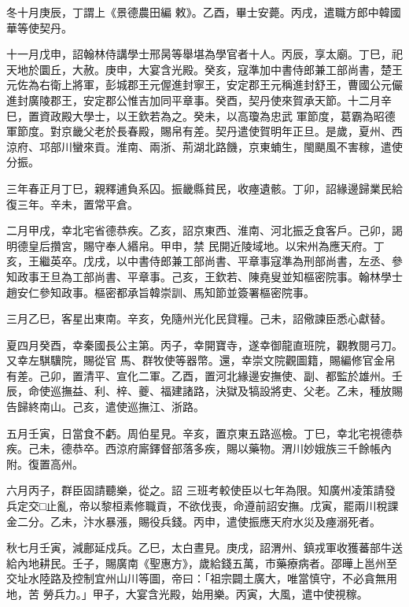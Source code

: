 \begin{pinyinscope}
 冬十月庚辰，丁謂上《景德農田編
 敕》。乙酉，畢士安薨。丙戌，遣職方郎中韓國華等使契丹。



 十一月戊申，詔翰林侍講學士邢昺等舉堪為學官者十人。丙辰，享太廟。丁巳，祀天地於圜丘，大赦。庚申，大宴含光殿。癸亥，寇準加中書侍郎兼工部尚書，楚王元佐為右衛上將軍，彭城郡王元偓進封寧王，安定郡王元稱進封舒王，曹國公元儼進封廣陵郡王，安定郡公惟吉加同平章事。癸酉，契丹使來賀承天節。十二月辛巳，置資政殿大學士，以王欽若為之。癸未，以高瓊為忠武
 軍節度，葛霸為昭德軍節度。對京畿父老於長春殿，賜帛有差。契丹遣使賀明年正旦。是歲，夏州、西涼府、邛部川蠻來貢。淮南、兩浙、荊湖北路饑，京東蝻生，閩颶風不害稼，遣使分振。



 三年春正月丁巳，親釋逋負系囚。振畿縣貧民，收瘞遺骸。丁卯，詔緣邊歸業民給復三年。辛未，置常平倉。



 二月甲戌，幸北宅省德恭疾。乙亥，詔京東西、淮南、河北振乏食客戶。己卯，謁明德皇后攢宮，賜守奉人緡帛。甲申，禁
 民開近陵域地。以宋州為應天府。丁亥，王繼英卒。戊戌，以中書侍郎兼工部尚書、平章事寇準為刑部尚書，左丞、參知政事王旦為工部尚書、平章事。己亥，王欽若、陳堯叟並知樞密院事。翰林學士趙安仁參知政事。樞密都承旨韓崇訓、馬知節並簽署樞密院事。



 三月乙巳，客星出東南。辛亥，免隨州光化民貸糧。己未，詔儆諫臣悉心獻替。



 夏四月癸酉，幸秦國長公主第。丙子，幸開寶寺，遂幸御龍直班院，觀教閱弓刀。又幸左騏驥院，賜從官
 馬、群牧使等器幣。還，幸崇文院觀圖籍，賜編修官金帛有差。己卯，置清平、宣化二軍。乙酉，置河北緣邊安撫使、副、都監於雄州。壬辰，命使巡撫益、利、梓、夔、福建諸路，決獄及犒設將吏、父老。乙未，種放賜告歸終南山。己亥，遣使巡撫江、浙路。



 五月壬寅，日當食不虧。周伯星見。辛亥，置京東五路巡檢。丁巳，幸北宅視德恭疾。己未，德恭卒。西涼府廝鐸督部落多疾，賜以藥物。渭川妙娥族三千餘帳內附。復置高州。



 六月丙子，群臣固請聽樂，從之。詔
 三班考較使臣以七年為限。知廣州凌策請發兵定交□止亂，帝以黎桓素修職貢，不欲伐喪，命遵前詔安撫。戊寅，罷兩川稅課金二分。乙未，汴水暴漲，賜役兵錢。丙申，遣使振應天府水災及瘞溺死者。



 秋七月壬寅，減鄜延戍兵。乙巳，太白晝見。庚戌，詔渭州、鎮戎軍收獲蕃部牛送給內地耕民。壬子，賜廣南《聖惠方》，歲給錢五萬，市藥療病者。邵曄上邕州至交址水陸路及控制宜州山川等圖，帝曰：「祖宗闢土廣大，唯當慎守，不必貪無用地，苦
 勞兵力。」甲子，大宴含光殿，始用樂。丙寅，大風，遣中使視稼。




\end{pinyinscope}
